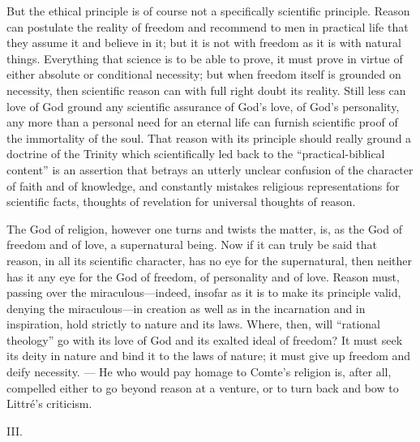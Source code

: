 \documentclass[12pt,a4paper]{article}
\newcommand{\opage}[1]{\marginnote{\footnotesize\textit{[#1]}}}
\begin{document}
But the ethical principle is of course not a specifically scientific
principle. Reason can postulate the reality of freedom and recommend to men
in practical life that they assume it and believe in it; but it is not with
freedom as it is with natural things. Everything that science is to be able
to prove, it must prove in virtue of either absolute or conditional
necessity; but
\opage{33}when freedom itself is grounded on necessity, then scientific
reason can with full right doubt its reality. Still less can love of
God ground any scientific assurance of God's love, of God's
personality, any more than a personal need for an eternal life can
furnish scientific proof of the immortality of the soul. That reason
with its principle should really ground a doctrine of the Trinity
which scientifically led back to the ``practical-biblical content'' is
an assertion that betrays an utterly unclear confusion of the
character of faith and of knowledge, and constantly mistakes religious
representations for scientific facts, thoughts of revelation for
universal thoughts of reason.

The God of religion, however one turns and twists the matter, is, as
the God of freedom and of love, a supernatural being. Now if it can
truly be said that reason, in all its scientific character, has no eye
for the supernatural, then neither has it any eye for the God of
freedom, of personality and of love. Reason must, passing over the
miraculous---indeed, insofar as it is to make its principle valid,
denying the miraculous---in creation as well as in the incarnation and
in inspiration, hold strictly to nature and its laws. Where, then,
will ``rational theology'' go with its love of God and its exalted
ideal of freedom? It must seek its deity in nature and bind it to the
laws of nature; it must give up freedom and deify necessity. --- He
who would pay homage to Comte's religion is, after all, compelled
either to go beyond reason at a venture, or to turn back and bow to
Littré's criticism.

\begin{center}III.\end{center}
\end{document}

